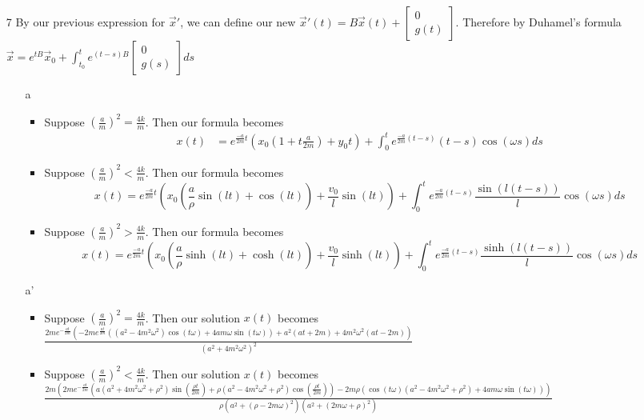 \documentclass[12pt, letterpaper]{article}
\begin{document}
\begin{enumerate}
\begin{enumerate}
\begin{itemize}
		\end{itemize}
	\end{enumerate}
	\item[7] By our previous expression for $\Vec{x}'$, we can define our new $\Vec{x}'(t) = B \Vec{x} (t) + \begin{bmatrix}0 \\ g(t) \end{bmatrix}$. 
		Therefore by Duhamel's formula $\Vec{x} = e^{tB}\Vec{x}_0 + \int_{t_0}^t e^{(t-s)B} \begin{bmatrix}0 \\ g(s) \end{bmatrix}ds$	
	\begin{enumerate}
		\item[a] 
		\begin{itemize}
			\item Suppose $(\frac{a}{m})^2 = \frac{4k}{m}$.  Then our formula becomes 
			\begin{align*}
				 x(t) &= e^{\frac{-a}{2m}t} (x_0(1 + t\frac{a}{2m}) + y_0 t) + \int_{0}^t  e^{\frac{-a}{2m}(t-s)}(t-s)\cos(\omega s) ds 
			\end{align*}			  
			\item Suppose $(\frac{a}{m})^2 < \frac{4k}{m}$.  Then our formula becomes 
			$$
			x(t) = e^{\frac{-a}{2m}t}(x_0 ( \frac{a}{\rho} \sin(lt) + \cos(lt)) + \frac{v_0}{l} \sin(lt)) + \int_0^t e^{\frac{-a}{2m}(t-s)} \frac{\sin(l(t-s))}{l} \cos(\omega s)ds		
			$$
			\item Suppose $(\frac{a}{m})^2 > \frac{4k}{m}$.  Then our formula becomes 
			$$
			x(t) =  e^{\frac{-a}{2m}t}(x_0 ( \frac{a}{\rho} \sinh(lt) + \cosh(lt)) + \frac{v_0}{l} \sinh(lt)) + \int_0^t e^{\frac{-a}{2m}(t-s)} \frac{\sinh(l(t-s))}{l} \cos(\omega s)ds							
			$$
		\end{itemize}
		\item[a']
		\begin{itemize}
			\item Suppose $(\frac{a}{m})^2 = \frac{4k}{m}$.  Then our solution $x(t)$ becomes\\ 
			$
			\frac{2 m e^{-\frac{a t}{2 m}} \left(-2 m e^{\frac{a t}{2 m}} \left(\left(a^2-4 m^2 \omega ^2\right) \cos (t \omega )+4 a m \omega  \sin (t
   \omega )\right)+a^2 (a t+2 m)+4 m^2 \omega ^2 (a t-2 m)\right)}{\left(a^2+4 m^2 \omega ^2\right)^2}	
			$
			\item Suppose $(\frac{a}{m})^2 < \frac{4k}{m}$.  Then our solution $x(t)$ becomes\\ 
			$
			\frac{2 m \left(2 m e^{-\frac{a t}{2 m}} \left(a \left(a^2+4 m^2 \omega ^2+\rho ^2\right) \sin \left(\frac{\rho  t}{2 m}\right)+\rho  \left(a^2-4
   m^2 \omega ^2+\rho ^2\right) \cos \left(\frac{\rho  t}{2 m}\right)\right)-2 m \rho  \left(\cos (t \omega ) \left(a^2-4 m^2 \omega ^2+\rho
   ^2\right)+4 a m \omega  \sin (t \omega )\right)\right)}{\rho  \left(a^2+(\rho -2 m \omega )^2\right) \left(a^2+(2 m \omega +\rho )^2\right)}		
			$
			

\end{itemize}
\end{enumerate}
\end{enumerate}
\end{document}
